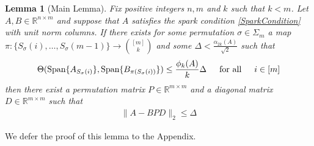 \documentclass[journal, onecolumn]{IEEEtran}
\newtheorem{lemma}{Lemma}
\begin{document}
\begin{lemma}[Main Lemma]\label{MainLemma}
Fix positive integers $n, m$ and $k$ such that $k < m$. Let $A, B \in \mathbb{R}^{n \times m}$ and suppose that $A$ satisfies the spark condition \eqref{SparkCondition} with unit norm columns. If there exists for some permutation $\sigma \in \Sigma_m$ a map $\pi: \{S_{\sigma}(i), \ldots, S_{\sigma}(m-1)\} \to {[m] \choose k}$ and some $\Delta < \frac{\alpha_{2k}(A)}{\sqrt{2}}$ such that 
\begin{equation}\label{GapUpperBound}
\Theta(\text{Span}\{A_{S_{\sigma}(i)}\}, \text{Span}\{B_{\pi(S_{\sigma}(i))}\}) \leq \frac{ \phi_k(A) }{k} \Delta \indent \text{for all} \indent i \in [m]
\end{equation}
%
then there exist a permutation matrix $P \in \mathbb{R}^{m \times m}$ and a diagonal matrix $D \in \mathbb{R}^{m \times m}$ such that
\begin{align}
\|A - BPD\|_2 \leq \Delta
\end{align}
\end{lemma}

We defer the proof of this lemma to the Appendix. 

\end{document}
